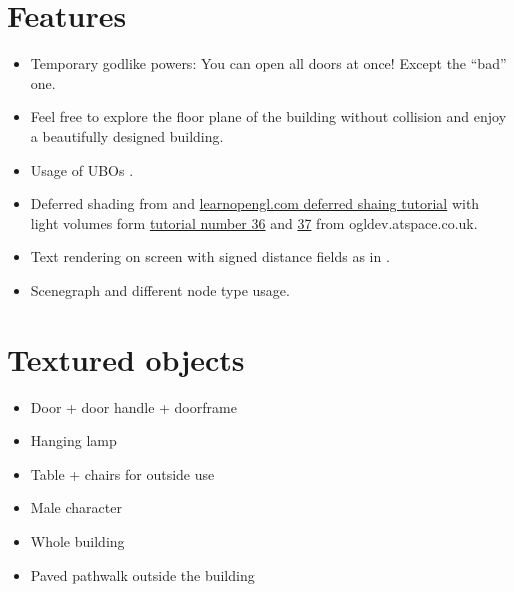 \documentclass[12pt]{article}
\begin{document}
\section{Features}
\begin{itemize}
	\item Temporary godlike powers: You can open all doors at once! Except the ``bad'' one.
	\item Feel free to explore the floor plane of the building without collision and enjoy a beautifully designed building.
	\item Usage of UBOs \cite{openGLSuperBible}.
	\item Deferred shading from \cite{openGLSuperBible} and \href{http://learnopengl.com/#!Advanced-Lighting/Deferred-Shading}{learnopengl.com deferred shaing tutorial} with light volumes form 
	\href{http://ogldev.atspace.co.uk/www/tutorial36/tutorial36.html}{tutorial number 36} and \href{http://ogldev.atspace.co.uk/www/tutorial37/tutorial37.html}{37} from ogldev.atspace.co.uk.
	\item Text rendering on screen with signed distance fields as in \cite{signedDistanceFields}.
	\item Scenegraph and different node type usage.
\end{itemize}


\section{Textured objects \label{Texture Mapping}} 
\begin{itemize}
\item Door + door handle + doorframe
\item Hanging lamp
\item Table + chairs for outside use
\item Male character
\item Whole building
\item Paved pathwalk outside the building
\end{itemize}
\end{document}

